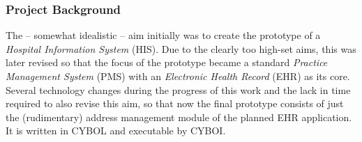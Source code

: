 %
%
%
%
%
%
%

\subsubsection{Project Background}
\label{project_background_heading}

The -- somewhat idealistic -- aim initially was to create the prototype of a
\emph{Hospital Information System} (HIS). Due to the clearly too high-set aims,
this was later revised so that the focus of the prototype became a standard
\emph{Practice Management System} (PMS) with an \emph{Electronic Health Record}
(EHR) as its core. Several technology changes during the progress of this work
and the lack in time required to also revise this aim, so that now the final
prototype consists of just the (rudimentary) address management module of the
planned EHR application. It is written in CYBOL and executable by CYBOI.
